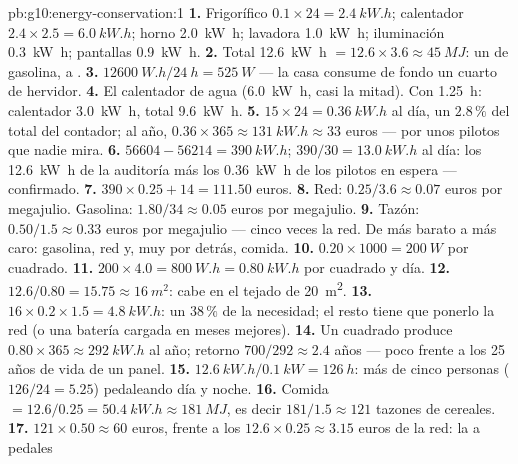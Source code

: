 \begin{solution}{pb:g10:energy-conservation:1}
\textbf{1.} Frigorífico $0.1 \times 24 = \qty{2.4}{kW.h}$; calentador
$2.4 \times 2.5 = \qty{6.0}{kW.h}$; horno \qty{2.0}{kW.h}; lavadora
\qty{1.0}{kW.h}; iluminación \qty{0.3}{kW.h}; pantallas
\qty{0.9}{kW.h}.
\textbf{2.} Total \qty{12.6}{kW.h} $= 12.6 \times 3.6 \approx
\qty{45}{MJ}$: un  de gasolina,  a .
\textbf{3.} $\qty{12600}{W.h}/\qty{24}{h} = \qty{525}{W}$ --- la casa
consume de fondo un cuarto de hervidor.
\textbf{4.} El calentador de agua (\qty{6.0}{kW.h}, casi la mitad). Con
\qty{1.25}{h}: calentador \qty{3.0}{kW.h}, total \qty{9.6}{kW.h}.
\textbf{5.} $15 \times 24 = \qty{0.36}{kW.h}$ al día, un $2.8\,\%$ del
total del contador; al año,
$0.36 \times 365 \approx \qty{131}{kW.h} \approx 33$ euros --- por unos
pilotos que nadie mira.
\textbf{6.} $56604 - 56214 = \qty{390}{kW.h}$;
$390/30 = \qty{13.0}{kW.h}$ al día: los \qty{12.6}{kW.h} de la
auditoría más los \qty{0.36}{kW.h} de los pilotos en espera ---
confirmado.
\textbf{7.} $390 \times 0.25 + 14 = 111.50$ euros.
\textbf{8.} Red: $0.25/3.6 \approx 0.07$ euros por megajulio.
Gasolina: $1.80/34 \approx 0.05$ euros por megajulio.
\textbf{9.} Tazón: $0.50/1.5 \approx 0.33$ euros por megajulio ---
cinco veces la red. De más barato a más caro: gasolina, red y, muy por
detrás, comida.
\textbf{10.} $0.20 \times 1000 = \qty{200}{W}$ por  cuadrado.
\textbf{11.} $200 \times 4.0 = \qty{800}{W.h} = \qty{0.80}{kW.h}$ por
 cuadrado y día.
\textbf{12.} $12.6/0.80 = 15.75 \approx \qty{16}{m^2}$: cabe en el
tejado de \qty{20}{m^2}.
\textbf{13.} $16 \times 0.2 \times 1.5 = \qty{4.8}{kW.h}$: un $38\,\%$ de
la necesidad; el resto tiene que ponerlo la red (o una batería cargada
en meses mejores).
\textbf{14.} Un  cuadrado produce
$0.80 \times 365 \approx \qty{292}{kW.h}$ al año; retorno
$700/292 \approx 2.4$ años --- poco frente a los 25 años de vida de un
panel.
\textbf{15.} $\qty{12.6}{kW.h}/\qty{0.1}{kW} = \qty{126}{h}$: más de
cinco personas ($126/24 = 5.25$) pedaleando día y noche.
\textbf{16.} Comida $= 12.6/0.25 = \qty{50.4}{kW.h} \approx
\qty{181}{MJ}$, es decir $181/1.5 \approx 121$ tazones de cereales.
\textbf{17.} $121 \times 0.50 \approx 60$ euros, frente a los
$12.6 \times 0.25 \approx 3.15$ euros de la red: la  a pedales

\end{solution}
